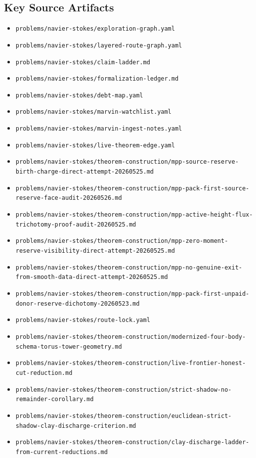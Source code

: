 \subsection{Key Source Artifacts}
\begin{itemize}
\item \texttt{problems/navier-stokes/exploration-graph.yaml}
\item \texttt{problems/navier-stokes/layered-route-graph.yaml}
\item \texttt{problems/navier-stokes/claim-ladder.md}
\item \texttt{problems/navier-stokes/formalization-ledger.md}
\item \texttt{problems/navier-stokes/debt-map.yaml}
\item \texttt{problems/navier-stokes/marvin-watchlist.yaml}
\item \texttt{problems/navier-stokes/marvin-ingest-notes.yaml}
\item \texttt{problems/navier-stokes/live-theorem-edge.yaml}
\item \texttt{problems/navier-stokes/theorem-construction/mpp-source-reserve-birth-charge-direct-attempt-20260525.md}
\item \texttt{problems/navier-stokes/theorem-construction/mpp-pack-first-source-reserve-face-audit-20260526.md}
\item \texttt{problems/navier-stokes/theorem-construction/mpp-active-height-flux-trichotomy-proof-audit-20260525.md}
\item \texttt{problems/navier-stokes/theorem-construction/mpp-zero-moment-reserve-visibility-direct-attempt-20260525.md}
\item \texttt{problems/navier-stokes/theorem-construction/mpp-no-genuine-exit-from-smooth-data-direct-attempt-20260525.md}
\item \texttt{problems/navier-stokes/theorem-construction/mpp-pack-first-unpaid-donor-reserve-dichotomy-20260523.md}
\item \texttt{problems/navier-stokes/route-lock.yaml}
\item \texttt{problems/navier-stokes/theorem-construction/modernized-four-body-schema-torus-tower-geometry.md}
\item \texttt{problems/navier-stokes/theorem-construction/live-frontier-honest-cut-reduction.md}
\item \texttt{problems/navier-stokes/theorem-construction/strict-shadow-no-remainder-corollary.md}
\item \texttt{problems/navier-stokes/theorem-construction/euclidean-strict-shadow-clay-discharge-criterion.md}
\item \texttt{problems/navier-stokes/theorem-construction/clay-discharge-ladder-from-current-reductions.md}
\end{itemize}

